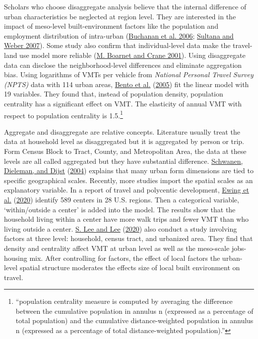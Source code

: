 \documentclass[
  11pt,
  openany]{memoir}
\begin{document}
Scholars who choose disaggregate analysis believe that the internal difference of urban characteristics be neglected at region level. They are interested in the impact of meso-level built-environment factors like the population and employment distribution of intra-urban (\protect\hyperlink{ref-buchananEffectUrbanGrowth2006}{Buchanan et al. 2006}; \protect\hyperlink{ref-sultanaJourneytoWorkPatternsAge2007}{Sultana and Weber 2007}).
Some study also confirm that individual-level data make the travel-land use model more reliable (\protect\hyperlink{ref-boarnetInfluenceLandUse2001}{M. Boarnet and Crane 2001}).
Using disaggregate data can disclose the neighborhood-level differences and eliminate aggregation bias. Using logarithms of VMTs per vehicle from \emph{National Personal Travel Survey (NPTS)} data with 114 urban areas, \protect\hyperlink{ref-bentoEffectsUrbanSpatial2005}{Bento et al.} (\protect\hyperlink{ref-bentoEffectsUrbanSpatial2005}{2005}) fit the linear model with 19 variables. They found that, instead of population density, population centrality has a significant effect on VMT. The elasticity of annual VMT with respect to population centrality is 1.5.\footnote{``population centrality measure is computed by averaging the difference between the cumulative population in annulus n (expressed as a percentage of total population) and the cumulative distance-weighted population in annulus n (expressed as a percentage of total distance-weighted population).''}

Aggregate and disaggregate are relative concepts. Literature usually treat the data at household level as disaggregated but it is aggregated by person or trip. Form Census Block to Tract, County, and Metropolitan Area, the data at these levels are all called aggregated but they have substantial difference.
\protect\hyperlink{ref-schwanenImpactMetropolitanStructure2004}{Schwanen, Dieleman, and Dijst} (\protect\hyperlink{ref-schwanenImpactMetropolitanStructure2004}{2004}) explains that many urban form dimensions are tied to specific geographical scales. Recently, more studies import the spatial scales as an explanatory variable. In a report of travel and polycentic development, \protect\hyperlink{ref-ewingReducingVehicleMiles2020}{Ewing et al.} (\protect\hyperlink{ref-ewingReducingVehicleMiles2020}{2020}) identify 589 centers in 28 U.S. regions. Then a categorical variable, `within/outside a center' is added into the model. The results show that the household living within a center have more walk trips and fewer VMT than who living outside a center.
\protect\hyperlink{ref-leeComparingImpactsLocal2020}{S. Lee and Lee} (\protect\hyperlink{ref-leeComparingImpactsLocal2020}{2020}) also conduct a study involving factors at three level: household, census tract, and urbanized area. They find that density and centrality affect VMT at urban level as well as the meso-scale jobs-housing mix. After controlling for factors, the effect of local factors the urban-level spatial structure moderates the effects size of local built environment on travel.
\end{document}
